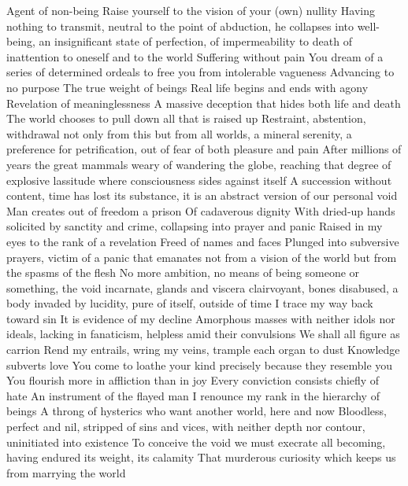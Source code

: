 \documentclass{article}
\begin{document}
Agent of non-being
Raise yourself to the vision of your (own) nullity
Having nothing to transmit, neutral to the point of abduction, he collapses into well-being, an insignificant state of perfection, of impermeability to death of inattention to oneself and to the world
Suffering without pain
You dream of a series of determined ordeals to free you from intolerable vagueness
Advancing to no purpose
The true weight of beings
Real life begins and ends with agony
Revelation of meaninglessness
A massive deception that hides both life and death
The world chooses to pull down all that is raised up
Restraint, abstention, withdrawal not only from this but from all worlds, a mineral serenity, a preference for petrification, out of fear of both pleasure and pain
After millions of years the great mammals weary of wandering the globe, reaching that degree of explosive lassitude where consciousness sides against itself
A succession without content, time has lost its substance, it is an abstract version of our personal void
Man creates out of freedom a prison
Of cadaverous dignity
With dried-up hands solicited by sanctity and crime, collapsing into prayer and panic
Raised in my eyes to the rank of a revelation
Freed of names and faces
Plunged into subversive prayers, victim of a panic that emanates not from a vision of the world but from the spasms of the flesh
No more ambition, no means of being someone or something, the void incarnate, glands and viscera clairvoyant, bones disabused, a body invaded by lucidity, pure of itself, outside of time
I trace my way back toward sin
It is evidence of my decline
Amorphous masses with neither idols nor ideals, lacking in fanaticism, helpless amid their convulsions
We shall all figure as carrion
Rend my entrails, wring my veins, trample each organ to dust
Knowledge subverts love
You come to loathe your kind precisely because they resemble you
You flourish more in affliction than in joy
Every conviction consists chiefly of hate
An instrument of the flayed man
I renounce my rank in the hierarchy of beings
A throng of hysterics who want another world, here and now
Bloodless, perfect and nil, stripped of sins and vices, with neither depth nor contour, uninitiated into existence
To conceive the void we must execrate all becoming, having endured its weight, its calamity
That murderous curiosity which keeps us from marrying the world
\fi
\end{document}
